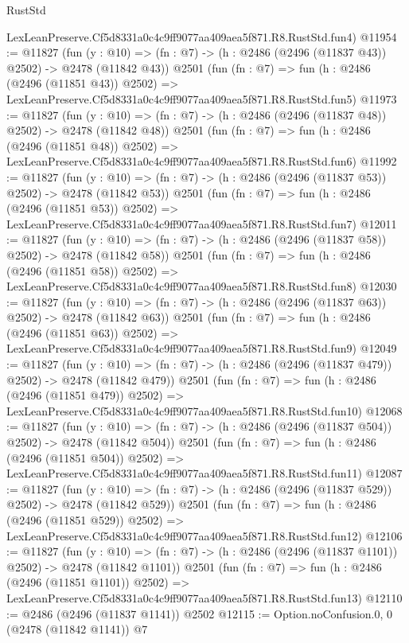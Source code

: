 \begin{lexlean}{RustStd}
\begin{coremodule}
    LexLeanPreserve.Cf5d8331a0c4c9ff9077aa409aea5f871.R8.RustStd.fun4)
@11954 := @11827
    (fun (y : @10) => (fn : @7) -> (h : @2486 (@2496 (@11837 @43)) @2502) -> @2478 (@11842 @43))
    @2501
    (fun (fn : @7) =>
    fun (h : @2486 (@2496 (@11851 @43)) @2502) =>
    LexLeanPreserve.Cf5d8331a0c4c9ff9077aa409aea5f871.R8.RustStd.fun5)
@11973 := @11827
    (fun (y : @10) => (fn : @7) -> (h : @2486 (@2496 (@11837 @48)) @2502) -> @2478 (@11842 @48))
    @2501
    (fun (fn : @7) =>
    fun (h : @2486 (@2496 (@11851 @48)) @2502) =>
    LexLeanPreserve.Cf5d8331a0c4c9ff9077aa409aea5f871.R8.RustStd.fun6)
@11992 := @11827
    (fun (y : @10) => (fn : @7) -> (h : @2486 (@2496 (@11837 @53)) @2502) -> @2478 (@11842 @53))
    @2501
    (fun (fn : @7) =>
    fun (h : @2486 (@2496 (@11851 @53)) @2502) =>
    LexLeanPreserve.Cf5d8331a0c4c9ff9077aa409aea5f871.R8.RustStd.fun7)
@12011 := @11827
    (fun (y : @10) => (fn : @7) -> (h : @2486 (@2496 (@11837 @58)) @2502) -> @2478 (@11842 @58))
    @2501
    (fun (fn : @7) =>
    fun (h : @2486 (@2496 (@11851 @58)) @2502) =>
    LexLeanPreserve.Cf5d8331a0c4c9ff9077aa409aea5f871.R8.RustStd.fun8)
@12030 := @11827
    (fun (y : @10) => (fn : @7) -> (h : @2486 (@2496 (@11837 @63)) @2502) -> @2478 (@11842 @63))
    @2501
    (fun (fn : @7) =>
    fun (h : @2486 (@2496 (@11851 @63)) @2502) =>
    LexLeanPreserve.Cf5d8331a0c4c9ff9077aa409aea5f871.R8.RustStd.fun9)
@12049 := @11827
    (fun (y : @10) => (fn : @7) -> (h : @2486 (@2496 (@11837 @479)) @2502) -> @2478 (@11842 @479))
    @2501
    (fun (fn : @7) =>
    fun (h : @2486 (@2496 (@11851 @479)) @2502) =>
    LexLeanPreserve.Cf5d8331a0c4c9ff9077aa409aea5f871.R8.RustStd.fun10)
@12068 := @11827
    (fun (y : @10) => (fn : @7) -> (h : @2486 (@2496 (@11837 @504)) @2502) -> @2478 (@11842 @504))
    @2501
    (fun (fn : @7) =>
    fun (h : @2486 (@2496 (@11851 @504)) @2502) =>
    LexLeanPreserve.Cf5d8331a0c4c9ff9077aa409aea5f871.R8.RustStd.fun11)
@12087 := @11827
    (fun (y : @10) => (fn : @7) -> (h : @2486 (@2496 (@11837 @529)) @2502) -> @2478 (@11842 @529))
    @2501
    (fun (fn : @7) =>
    fun (h : @2486 (@2496 (@11851 @529)) @2502) =>
    LexLeanPreserve.Cf5d8331a0c4c9ff9077aa409aea5f871.R8.RustStd.fun12)
@12106 := @11827
    (fun (y : @10) => (fn : @7) -> (h : @2486 (@2496 (@11837 @1101)) @2502) -> @2478 (@11842 @1101))
    @2501
    (fun (fn : @7) =>
    fun (h : @2486 (@2496 (@11851 @1101)) @2502) =>
    LexLeanPreserve.Cf5d8331a0c4c9ff9077aa409aea5f871.R8.RustStd.fun13)
@12110 := @2486 (@2496 (@11837 @1141)) @2502
@12115 := Option.noConfusion.{0, 0} (@2478 (@11842 @1141)) @7

\end{coremodule}
\end{lexlean}
